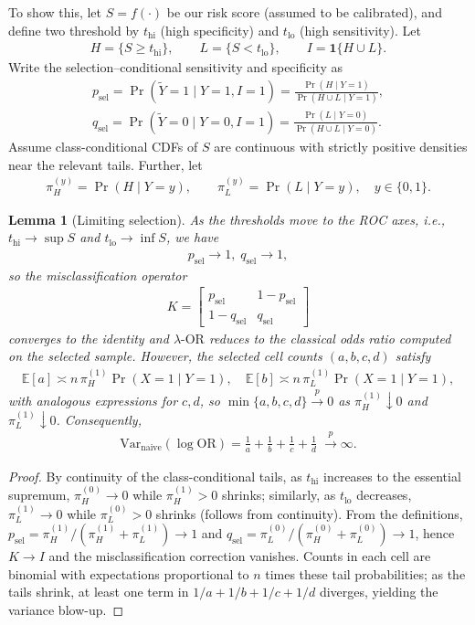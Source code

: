\documentclass[pdflatex,sn-mathphys-num]{sn-jnl}%
\def\EQSP{3pt}
\newcommand{\cgather}[2][\EQSP]{\begingroup\setlength\abovedisplayskip{#1}\setlength\belowdisplayskip{#1}\begin{gather} #2 \end{gather}\endgroup\noindent}
\newcommand{\SPOR}{\textrm{$\lambda$-OR}}
\theoremstyle{thmstyleone}%
\newtheorem{lemma}[theorem]{Lemma} %
\theoremstyle{thmstyletwo}%
\theoremstyle{thmstylethree}%
\begin{document}
To show this, let $S=f(\cdot)$ be our risk score (assumed to be  calibrated), and define two threshold by
$t_{\mathrm{hi}}$ (high specificity) and $t_{\mathrm{lo}}$ (high sensitivity). Let
\cgather{
H=\{S\ge t_{\mathrm{hi}}\},\qquad L=\{S<t_{\mathrm{lo}}\},\qquad I=\mathbf{1}\{H\cup L\}.
}
Write the selection–conditional sensitivity and specificity as
\cgather{
p_{\text{sel}}=\Pr(\tilde Y=1\mid Y=1,I=1)=\frac{\Pr(H\mid Y=1)}{\Pr(H\cup L\mid Y=1)},\\
q_{\text{sel}}=\Pr(\tilde Y=0\mid Y=0,I=1)=\frac{\Pr(L\mid Y=0)}{\Pr(H\cup L\mid Y=0)}.
}%
Assume class-conditional CDFs of $S$ are continuous with strictly positive densities near the relevant tails. Further, let
\cgather{
\pi_H^{(y)}=\Pr(H\mid Y=y),\qquad \pi_L^{(y)}=\Pr(L\mid Y=y),\quad y\in\{0,1\}.
}
%
\begin{lemma}[Limiting selection]\label{lemsel}
As the thresholds move to the ROC axes, i.e., $t_{\mathrm{hi}} \to \sup S$ and $t_{\mathrm{lo}} \to \inf S$, we have
\cgather{
p_{\text{sel}}\to 1, \;  q_{\text{sel}}\to 1,
}
so the misclassification operator
\cgather{
K=\begin{bmatrix} p_{\text{sel}}&1-p_{\text{sel}}\\ 1-q_{\text{sel}}&q_{\text{sel}}\end{bmatrix}}
converges to the identity and $\SPOR$ reduces to the classical odds ratio computed on the selected sample.
However, the selected cell counts $(a,b,c,d)$ satisfy
\cgather{
\mathbb{E}[a]\asymp n\,\pi_H^{(1)}\Pr(X{=}1\mid Y{=}1),\quad
\mathbb{E}[b]\asymp n\,\pi_L^{(1)}\Pr(X{=}1\mid Y{=}1),
}
with analogous expressions for $c,d$, so $\min\{a,b,c,d\}\stackrel{p}{\to}0$ as $\pi_H^{(1)}\!\downarrow 0$ and $\pi_L^{(1)}\!\downarrow 0$. Consequently,
\cgather{
\mathrm{Var}_{\text{naive}}(\log\mathrm{OR})=\frac{1}{a}+\frac{1}{b}+\frac{1}{c}+\frac{1}{d}\;\xrightarrow{p}\infty.
}
\end{lemma}
\begin{proof}
By continuity of the class-conditional tails, as $t_{\mathrm{hi}}$ increases to the essential supremum,
$\pi_H^{(0)}\to 0$ while $\pi_H^{(1)}>0$ shrinks; similarly, as $t_{\mathrm{lo}}$ decreases,
$\pi_L^{(1)}\to 0$ while $\pi_L^{(0)}>0$ shrinks (follows from continuity). From the definitions,
$p_{\text{sel}}=\pi_H^{(1)}/(\pi_H^{(1)}+\pi_L^{(1)})\to 1$ and
$q_{\text{sel}}=\pi_L^{(0)}/(\pi_H^{(0)}+\pi_L^{(0)})\to 1$, hence $K\to I$ and
the misclassification correction vanishes. Counts in each cell are binomial with expectations proportional
to $n$ times these tail probabilities; as the tails shrink, at least one term in $1/a+1/b+1/c+1/d$
diverges, yielding the variance blow-up. 
\end{proof}
%
\end{document}
